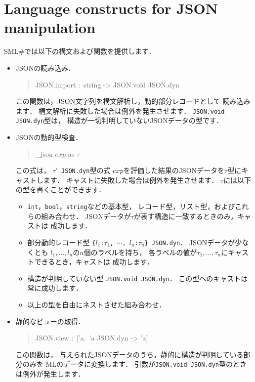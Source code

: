 \documentclass{jbook}
\newcommand{\txt}[2]{#2}
\newcommand{\smlsharp}{SML\#}
\newenvironment{program}{\begin{quote}\begin{tt}}%
                        {\end{tt}\end{quote}}
\begin{document}
\fi%

\section{
\txt{JSONの操作}
    {Language constructs for JSON manipulation}
}

\ifjp%
        \smlsharp{}では以下の構文および関数を提供します．
\begin{itemize}
\item
	JSONの読み込み．
\begin{program}
JSON.import :\ string -> JSON.void JSON.dyn
\end{program}
	この関数は，JSON文字列を構文解析し，動的部分レコードとして
読み込みます．
	構文解析に失敗した場合は例外を発生させます．
        {\tt JSON.void JSON.dyn}型は，
構造が一切判明していないJSONデータの型です．

\item
	JSONの動的型検査．
\begin{program}
\_json $\mathit{exp}$ as $\tau$
\end{program}
        この式は，
{\tt $\tau'$ JSON.dyn}型の式
$\mathit{exp}$を評価した結果のJSONデータを$\tau$型にキャストします．
	キャストに失敗した場合は例外を発生させます．
	$\tau$には以下の型を書くことができます．
\begin{itemize}
\item
	{\tt int}，{\tt bool}，{\tt string}などの基本型，
レコード型，リスト型，およびこれらの組み合わせ．
	JSONデータが$\tau$が表す構造に一致するときのみ，キャストは
成功します．
\item
        部分動的レコード型
{\tt \{$l_1$:$\tau_1$, $\cdots$, $l_n$:$\tau_n$\} JSON.dyn}．
	JSONデータが少なくとも
$l_1,\ldots,l_n$の$n$個のラベルを持ち，
各ラベルの値が$\tau_1,\ldots,\tau_n$にキャストできるとき，キャストは
成功します．
\item
	構造が判明していない型
{\tt JSON.void JSON.dyn}．
	この型へのキャストは常に成功します．
\item
	以上の型を自由にネストさせた組み合わせ．
\end{itemize}

\item
	静的なビューの取得．
\begin{program}
JSON.view :\ ['a.\ 'a JSON.dyn -> 'a]
\end{program}
	この関数は，
与えられたJSONデータのうち，静的に構造が判明している部分のみを
MLのデータに変換します．
	引数が{\tt JSON.void JSON.dyn}型のときは例外が発生します．


\end{itemize}
\end{document}
